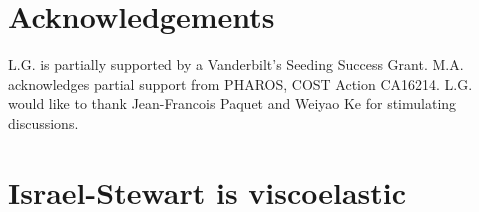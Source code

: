 \documentclass[a4paper, amsfonts, amssymb, amsmath, reprint, showkeys, nofootinbib, twoside, onecolumn, notitlepage]{revtex4-1}
\theoremstyle{definition}
\theoremstyle{theorem}
\begin{document}
\section*{Acknowledgements}

L.G. is partially supported by a Vanderbilt’s Seeding Success Grant.
M.A. acknowledges partial support from PHAROS, COST Action CA16214. L.G. would like to thank Jean-Francois Paquet and Weiyao Ke for stimulating discussions.

\appendix

\section{Israel-Stewart is viscoelastic}
\label{kjhA}

\end{document}
